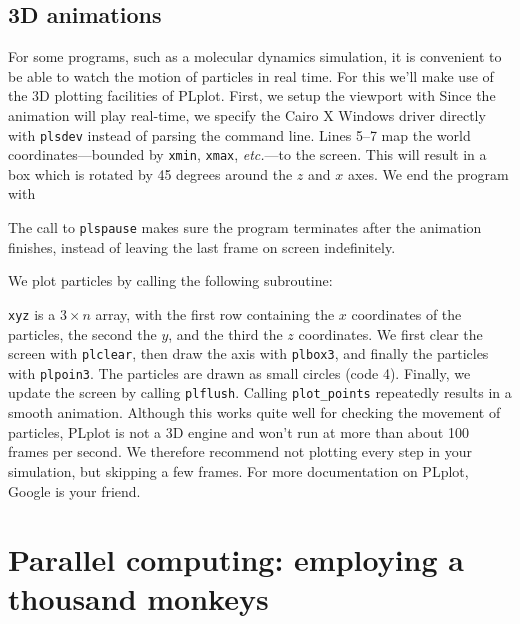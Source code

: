 \documentclass[openany,oneside]{report}
\begin{document}
\section{3D animations}

For some programs, such as a molecular dynamics simulation, it is convenient to be able to watch the motion of particles in real time.
For this we'll make use of the 3D plotting facilities of PLplot.
First, we setup the viewport with
Since the animation will play real-time, we specify the Cairo X Windows driver directly with \texttt{plsdev} instead of parsing the command line.
Lines 5--7 map the world coordinates---bounded by \texttt{xmin}, \texttt{xmax}, \emph{etc.}---to the screen.
This will result in a box which is rotated by 45 degrees around the $z$ and $x$ axes.
We end the program with

The call to \texttt{plspause} makes sure the program terminates after the animation finishes, instead of leaving the last frame on screen indefinitely.

We plot particles by calling the following subroutine:

\texttt{xyz} is a $3\times n$ array, with the first row containing the $x$ coordinates of the particles, the second the $y$, and the third the $z$ coordinates.
We first clear the screen with \texttt{plclear}, then draw the axis with \texttt{plbox3}, and finally the particles with \texttt{plpoin3}.
The particles are drawn as small circles (code 4).
Finally, we update the screen by calling \texttt{plflush}.
Calling \texttt{plot\_points} repeatedly results in a smooth animation.
Although this works quite well for checking the movement of particles, PLplot is not a 3D engine and won't run at more than about 100 frames per second.
We therefore recommend not plotting every step in your simulation, but skipping a few frames.
For more documentation on PLplot, Google is your friend.

\chapter[Parallel computing]{Parallel computing: employing a thousand monkeys}
\label{chap:Parallel computing}
\end{document}
